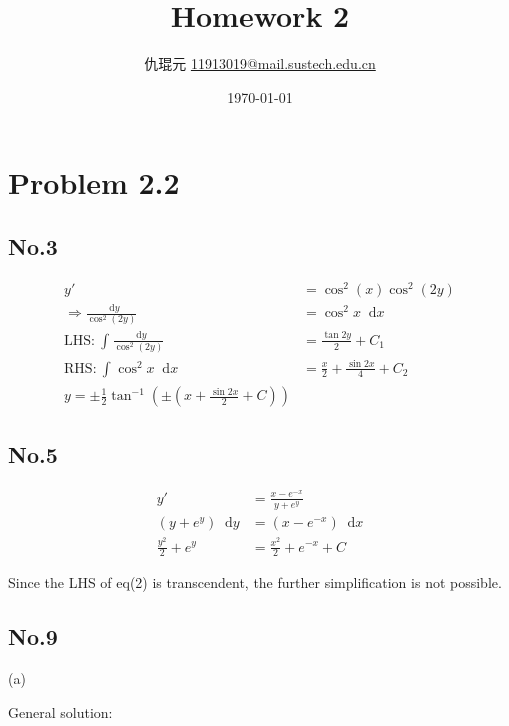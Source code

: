 \documentclass{article}
\newcommand{\dif}{\mathop{}\!\mathrm{d}}
\begin{document}
    \title{Homework 2}
    \author{仇琨元 {\color{hlinkblue} \underline{11913019@mail.sustech.edu.cn}}}
    \date{\today}
    \maketitle

\section{Problem 2.2}
\subsection{No.3}

\begin{equation}
    \begin{aligned}
        y'&=\cos^{2}(x)\cos^{2}(2y)\\
        \Rightarrow \frac{\dif y}{\cos^{2}(2y)}&=\cos^{2}x \dif x\\
        \text{LHS:}\ \int_{}^{} \frac{\dif y}{\cos^{2}(2y)}&=\frac{\tan 2y}{2}+C_{1}\\
        \text{RHS:}\ \int_{}^{} \cos^{2}x \dif x&=\frac{x}{2}+\frac{\sin 2x}{4}+C_{2}\\
        y=\pm\frac{1}{2} \tan^{-1}\left( \pm \left( x+\frac{\sin 2x}{2}+C \right)  \right)
    \end{aligned}
\end{equation}

\subsection{No.5}
\begin{equation}
    \begin{aligned}
        y'&=\frac{x-e^{-x}}{y+e^{y}}\\
        (y+e^{y})\dif y&=(x-e^{-x})\dif x\\
        \frac{y^{2}}{2}+e^{y}&=\frac{x^{2}}{2}+e^{-x}+C
    \end{aligned}
\end{equation}

Since the LHS of eq(2) is transcendent, the further simplification is not possible.

\subsection{No.9}

(a)

General solution:
\end{document}
